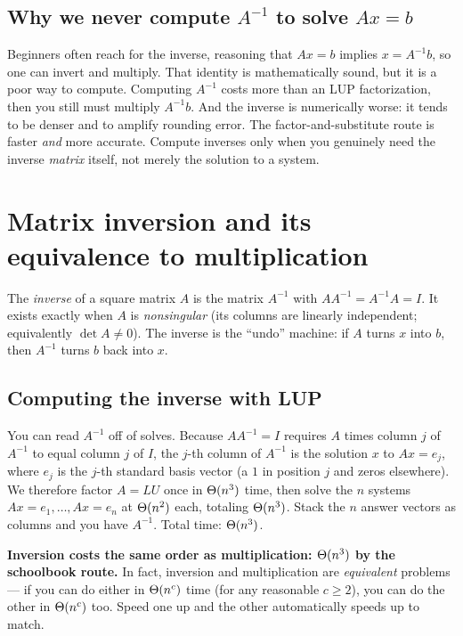 \subsection{Why we never compute $A^{-1}$ to solve $Ax=b$}

Beginners often reach for the inverse, reasoning that $Ax=b$ implies $x=A^{-1}b$, so one can invert and
multiply. That identity is mathematically sound, but it is a poor way to compute. Computing $A^{-1}$ costs
more than an LUP factorization, then you still must multiply $A^{-1}b$. And the
inverse is numerically worse: it tends to be denser and to amplify rounding error.
The factor-and-substitute route is faster \emph{and} more accurate. Compute
inverses only when you genuinely need the inverse \emph{matrix} itself, not merely
the solution to a system.

\section{Matrix inversion and its equivalence to multiplication}

The \emph{inverse} of a square matrix $A$ is the matrix $A^{-1}$ with
$AA^{-1}=A^{-1}A=I$. It exists exactly when $A$ is \emph{nonsingular} (its columns
are linearly independent; equivalently $\det A\ne 0$). The inverse is the ``undo''
machine: if $A$ turns $x$ into $b$, then $A^{-1}$ turns $b$ back into $x$.

\subsection{Computing the inverse with LUP}

You can read $A^{-1}$ off of solves. Because $AA^{-1}=I$ requires $A$ times
column $j$ of $A^{-1}$ to equal column $j$ of $I$, the $j$-th column of $A^{-1}$
is the solution $x$ to $Ax=e_j$, where $e_j$ is the $j$-th standard basis
vector (a $1$ in position $j$ and zeros elsewhere). We therefore factor $A=LU$
once in $\Theta(n^3)$ time, then solve the $n$ systems $Ax=e_1,\dots,Ax=e_n$ at
$\Theta(n^2)$ each, totaling $\Theta(n^3)$. Stack the $n$ answer vectors as columns and you have $A^{-1}$. Total
time: $\Theta(n^3)$.

\begin{focusbox}
\textbf{Inversion costs the same order as multiplication: $\Theta(n^3)$ by the
schoolbook route.} In fact, inversion and
multiplication are \emph{equivalent} problems --- if you can do either in
$\Theta(n^c)$ time (for any reasonable $c\ge 2$), you can do the other in
$\Theta(n^c)$ too. Speed one up and the other automatically speeds up to match.
\end{focusbox}

